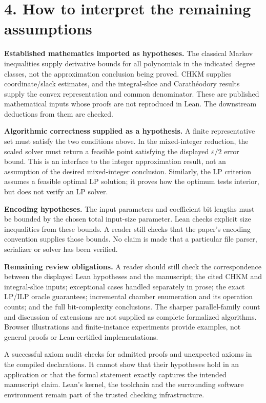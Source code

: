 \documentclass[10pt]{article}
\begin{document}
\newpage
\section*{4. How to interpret the remaining assumptions}
\textbf{Established mathematics imported as hypotheses.}
The classical Markov inequalities supply derivative bounds for all polynomials in the indicated degree classes, not the approximation conclusion being proved. CHKM supplies coordinate/slack estimates, and the integral-slice and Carath\'eodory results supply the convex representation and common denominator. These are published mathematical inputs whose proofs are not reproduced in Lean. The downstream deductions from them are checked.

\textbf{Algorithmic correctness supplied as a hypothesis.}
A finite representative set must satisfy the two conditions above. In the mixed-integer reduction, the scaled solver must return a feasible point satisfying the displayed $\varepsilon/2$ error bound. This is an interface to the integer approximation result, not an assumption of the desired mixed-integer conclusion. Similarly, the LP criterion assumes a feasible optimal LP solution; it proves how the optimum tests interior, but does not verify an LP solver.

\textbf{Encoding hypotheses.}
The input parameters and coefficient bit lengths must be bounded by the chosen total input-size parameter. Lean checks explicit size inequalities from these bounds. A reader still checks that the paper's encoding convention supplies those bounds. No claim is made that a particular file parser, serializer or solver has been verified.

\textbf{Remaining review obligations.}
A reader should still check the correspondence between the displayed Lean hypotheses and the manuscript; the cited CHKM and integral-slice inputs; exceptional cases handled separately in prose; the exact LP/ILP oracle guarantees; incremental chamber enumeration and its operation counts; and the full bit-complexity conclusions. The sharper parallel-family count and discussion of extensions are not supplied as complete formalized algorithms. Browser illustrations and finite-instance experiments provide examples, not general proofs or Lean-certified implementations.

A successful axiom audit checks for admitted proofs and unexpected axioms in the compiled declarations. It cannot show that their hypotheses hold in an application or that the formal statement exactly captures the intended manuscript claim. Lean's kernel, the toolchain and the surrounding software environment remain part of the trusted checking infrastructure.
\end{document}
